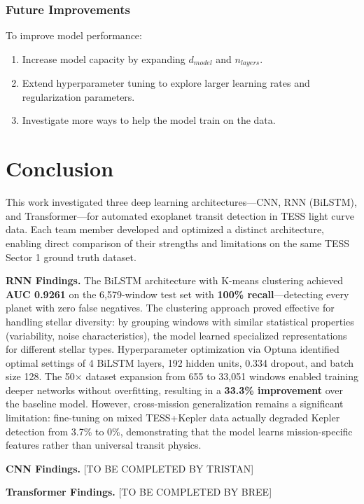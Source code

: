 \documentclass[letterpaper]{article} %
\begin{document}
\subsubsection*{Future Improvements}

To improve model performance:
\begin{enumerate}
    \item Increase model capacity by expanding \(d_{model}\) and \(n_{layers}\).
    \item Extend hyperparameter tuning to explore larger learning rates and regularization parameters.
    \item Investigate more ways to help the model train on the data.
\end{enumerate}


\section*{Conclusion}

This work investigated three deep learning architectures---CNN, RNN (BiLSTM), and Transformer---for automated exoplanet transit detection in TESS light curve data. Each team member developed and optimized a distinct architecture, enabling direct comparison of their strengths and limitations on the same TESS Sector 1 ground truth dataset.

\textbf{RNN Findings.} The BiLSTM architecture with K-means clustering achieved \textbf{AUC 0.9261} on the 6,579-window test set with \textbf{100\% recall}---detecting every planet with zero false negatives. The clustering approach proved effective for handling stellar diversity: by grouping windows with similar statistical properties (variability, noise characteristics), the model learned specialized representations for different stellar types. Hyperparameter optimization via Optuna identified optimal settings of 4 BiLSTM layers, 192 hidden units, 0.334 dropout, and batch size 128. The 50$\times$ dataset expansion from 655 to 33,051 windows enabled training deeper networks without overfitting, resulting in a \textbf{33.3\% improvement} over the baseline model. However, cross-mission generalization remains a significant limitation: fine-tuning on mixed TESS+Kepler data actually degraded Kepler detection from 3.7\% to 0\%, demonstrating that the model learns mission-specific features rather than universal transit physics.

\textbf{CNN Findings.} [TO BE COMPLETED BY TRISTAN]

\textbf{Transformer Findings.} [TO BE COMPLETED BY BREE]
\end{document}
